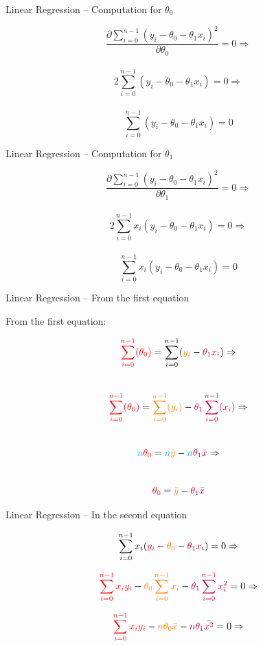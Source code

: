 \documentclass{beamer}
\begin{document}
\begin{frame}
{\centerline{Linear Regression -- Computation for $\theta_0$}}

$$ \frac{\partial \sum_{i=0}^{n-1}(y_i - \theta_0 - \theta_1 x_i)^2}{\partial \theta_0} =  0 \Rightarrow$$ \\
$$ 2 \sum_{i=0}^{n-1}(y_i - \theta_0 - \theta_1 x_i) = 0 \Rightarrow$$ \\
$$ \sum_{i=0}^{n-1}(y_i - \theta_0 - \theta_1 x_i) = 0 $$

\end{frame}

\begin{frame}
{\centerline{Linear Regression -- Computation for $\theta_1$}}

$$ \frac{\partial \sum_{i=0}^{n-1}(y_i - \theta_0 - \theta_1 x_i)^2}{\partial \theta_1} =  0 \Rightarrow$$ \\
$$ 2 \sum_{i=0}^{n-1}x_i(y_i - \theta_0 - \theta_1 x_i) = 0 \Rightarrow$$ \\
$$ \sum_{i=0}^{n-1}x_i(y_i - \theta_0 - \theta_1 x_i) = 0 $$

\end{frame}

\begin{frame}
{\centerline{Linear Regression -- From the first equation}}

From the first equation:

$$ \textcolor{red}{\sum_{i=0}^{n-1}(\theta_0) }= \sum_{i=0}^{n-1}( \textcolor{orange}{y_i} - \textcolor{purple}{\theta_1 x_i})  \Rightarrow $$ \\
$$ \textcolor{red}{\sum_{i=0}^{n-1}(\theta_0)} = \textcolor{orange}{\sum_{i=0}^{n-1}( y_i )} - \textcolor{purple}{\theta_1 \sum_{i=0}^{n-1}(x_i)}  \Rightarrow $$\\
$$ \textcolor{cyan}{n} \textcolor{red}{\theta_0} =  \textcolor{cyan}{n} \textcolor{orange}{\bar{y}} -  \textcolor{cyan}{n} \textcolor{purple}{\theta_1 \bar{x}}  \Rightarrow $$\\
$$ \textcolor{red}{\theta_0} = \textcolor{orange}{\bar{y}} - \textcolor{purple}{\theta_1 \bar{x} } $$



\end{frame}

\begin{frame}
{\centerline{Linear Regression -- In the second equation}}
$$ \sum_{i=0}^{n-1}x_i(\textcolor{red}{y_i} - \textcolor{orange}{\theta_0} - \textcolor{purple}{\theta_1 x_i}) = 0   \Rightarrow $$

$$ \textcolor{red}{\sum_{i=0}^{n-1}x_iy_i} - \textcolor{orange}{\theta_0 \sum_{i=0}^{n-1}x_i} - \textcolor{purple}{\theta_1 \sum_{i=0}^{n-1}x_i^2} = 0 \Rightarrow $$

$$ \textcolor{red}{\sum_{i=0}^{n-1}x_iy_i} - \textcolor{orange}{n \theta_0 \bar{x}}  - \textcolor{purple}{n \theta_1 \bar{x^2}} = 0 \Rightarrow $$


\end{frame}
\end{document}
